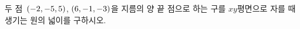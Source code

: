 두 점~$(-2{,}\mkern3mu\mathopen{}-5{,}\mkern3mu\mathopen{}5)$, $(6{,}\mkern3mu\mathopen{}-1{,}\mkern3mu\mathopen{}-3)$을 지름의 양 끝 점으로 하는 구를 $xy$평면으로 자를 때 생기는 원의 넓이를 구하시오.
